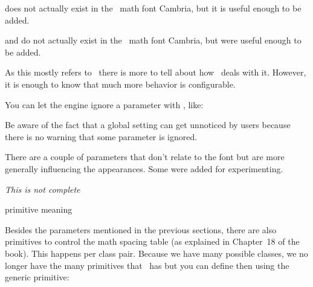 \startitem
     does not actually exist in the
     \OPENTYPE\ math font Cambria, but it is useful enough to be
    added.
\stopitem

\startitem
     and 
    do not actually exist in the  \OPENTYPE\ math font Cambria,
    but were useful enough to be added.
\stopitem

\stopitemize

As this mostly refers to \LUATEX\ there is more to tell about how \LUAMETATEX\
deals with it. However, it is enough to know that much more behavior is
configurable.

You can let the engine ignore a parameter with \typ {\setmathignore}, like:

\starttyping
\setmathignore {}
\setmathignore {}
\stoptyping

Be aware of the fact that a global setting can get unnoticed by users because
there is no warning that some parameter is ignored.

There are a couple of parameters that don't relate to the font but are more generally
influencing the appearances. Some were added for experimenting.

{\em This is not complete}

\starttabulate[|l|l|]
\FL
\BC primitive \BC meaning \NC \NR
\TL
\NC \type {\Umathextrasubpreshift} \NC \NC \NR
\NC \type {\Umathextrasubprespace} \NC \NC \NR
\NC \type {\Umathextrasubshift}    \NC \NC \NR
\NC \type {\Umathextrasubspace}    \NC \NC \NR
\NC \type {\Umathextrasuppreshift} \NC \NC \NR
\NC \type {\Umathextrasupprespace} \NC \NC \NR
\NC \type {\Umathextrasupshift}    \NC \NC \NR
\NC \type {\Umathextrasupspace}    \NC \NC \NR
\NC \type {\Umathprimeshiftdrop}   \NC \NC \NR
\LL
\stoptabulate

\stopsection

\startsection[title={Math spacing}]

Besides the parameters mentioned in the previous sections, there are also
primitives to control the math spacing table (as explained in Chapter~18 of the
\TEX book). This happens per class pair. Because we have many possible classes,
we no longer have the many primitives that \LUATEX\ has but you can define then
using the generic \type {\setmathspacing} primitive:

\starttyping
\def\Umathordordspacing     {\setmathspacing 0 0 }
\def\Umathordordopenspacing {\setmathspacing 0 4 }
\stoptyping

